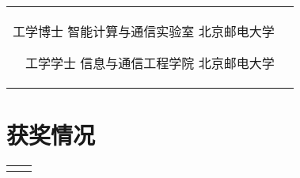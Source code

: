 \documentclass[10pt]{article} %
\begin{document}
\begin{paracol}{2}
	
	\begin{supertabular}{rl} %
		
		
		{工学博士} %
		{} %
		{智能计算与通信实验室} %
		{北京邮电大学} %
		
		
		{工学学士} %
		{} %
		{信息与通信工程学院} %
		{北京邮电大学} %
		
		
	\end{supertabular}
	
	
	\section{获奖情况}
	
	
	
	
	
	\begin{supertabular}{rl} %
		
		
		
		

\end{supertabular}
\end{paracol}
\end{document}
